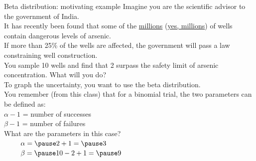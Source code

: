 \documentclass[xcolor=table,           xcolor=dvipsnames]{beamer}\usepackage[]{graphicx}\usepackage[]{color}
\begin{document}
\begin{frame}[fragile]{Beta distribution: motivating example}
\label{beta}
\pause Imagine you are the scientific advisor to the government of India. \pause \\
It has recently been found that some of the \href{https://aditimukherji.wordpress.com/2012/07/13/how-many-wells-and-tubewells-in-india-no-one-really-knows/}{millions} (\href{http://www.iwmi.cgiar.org/iwmi-tata/PDFs/2012_Highlight-05.pdf}{yes, millions}) of wells contain dangerous levels of arsenic. \pause \\
If more than 25\% of the wells are affected, the government will pass a law constraining well construction. \pause \\
You sample 10 wells and find that 2 surpass the safety limit of arsenic concentration. \pause \alert{What will you do?} \pause \\
To graph the uncertainty, you want to use the beta distribution. \pause \\
You remember (from this class) that for a binomial trial, the two parameters can be defined as:\\
\pause $\alpha-1$ = number of successes\\
\pause $\beta-1$ = number of failures\\
\pause What are the parameters in this case?\\
\pause ~~~~ $\alpha = \pause 2+1 = \pause 3$\\
\pause ~~~~ $\beta = \pause 10-2 + 1 = \pause 9$
\end{frame}

\end{document}
